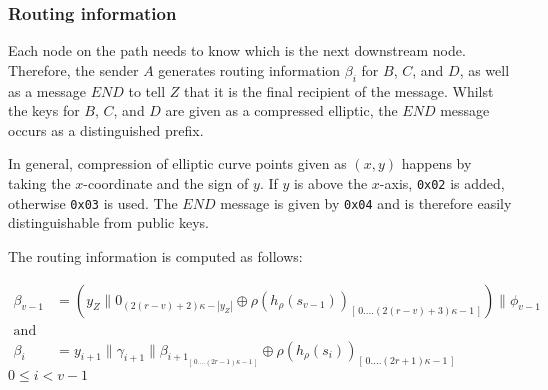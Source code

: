 \subsubsection{Routing information}
\label{sec:sphinx:routinginformation}

Each node on the path needs to know which is the next downstream node. Therefore, the sender $A$ generates routing information $\beta_i$ for $B$, $C$, and $D$, as well as a message $END$ to tell $Z$ that it is the final recipient of the message. Whilst the keys for $B$, $C$, and $D$ are given as a compressed elliptic, the $END$ message occurs as a distinguished prefix.

In general, compression of elliptic curve points given as $(x,y)$ happens by taking the $x$-coordinate and the sign of $y$. If $y$ is above the $x$-axis, \texttt{0x02} is added, otherwise \texttt{0x03} is used. The $END$ message is given by \texttt{0x04} and is therefore easily distinguishable from public keys.

\begin{comment}
The $END$ message is a distinguished prefix byte which is added to the final recipient's compressed public key. For ECDSA public key compression, only the $x$ coordinate is used and is prepended by $02$.

The $y$ coordinate is extracted from $x$ by resolving the secp256k1 elliptic curve equation $Y^2=X^3+7$ \cite{secp}. A square root extraction will yield $Y$ or $-Y$. The compressed point format includes the least significant bit of $Y$ in the first byte (the first byte is $0\times02$ or $0\times03$, depending on that bit).
\end{comment}

The routing information is computed as follows:

\begin{align}
    \beta_{v-1} & =(y_Z\|0_{(2(r-v)+2)\kappa-|y_Z|}\oplus \rho(h_{\rho}(s_{v-1}))_{[ \,0....(2(r-v)+3)\kappa-1\,]})\|\phi_{v-1}                \\
    \text{and}  & \nonumber                                                                                                                    \\
    \beta_i     & =y_{i+1}\|\gamma_{i+1}\|\beta_{{i+1}_{[ \,0....(2r-1)\kappa-1\,] }}\oplus \rho(h_{\rho}(s_{i}))_{[ \,0....(2r+1)\kappa-1\,]}
    \label{eq:2}
\end{align}
$0\le i < v-1$

